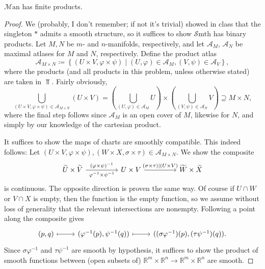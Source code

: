 \documentclass[11pt, letterpaper]{article}
\theoremstyle{theorem}
\begin{document}
\begin{proposition}\label{3.4}
	$\mathcal{M} \mathrm{an} $ has finite products.
\end{proposition}
\begin{proof}
	We (probably, I don't remember; if not it's trivial) showed in class that the singleton $*$ admits a smooth structure, so it suffices to show $\mathcal{S} \mathrm{mth} $ has binary products. Let $M,N$ be $m$- and $n$-manifolds, respectively, and let $\mathcal{A} _M$, $\mathcal{A} _N$ be maximal atlases for $M$ and $N$, respectively. Define the product atlas
	\[
		\mathcal{A}_{M\times N} \coloneqq \left\{ (U\times V,\varphi \times \psi )\mid (U,\varphi)\in \mathcal{A} _M,(V,\psi )\in \mathcal{A} _V \right\} ,
	\]
	where the products (and all products in this problem, unless otherwise stated) are taken in $\Top $. Fairly obviously,
	\[
		\bigcup_{(U\times V,\varphi \times \psi )\in \mathcal{A} _{M\times N} } (U\times V)=\left( \bigcup_{(U,\varphi )\in\mathcal{A} _M} U \right) \times \left( \bigcup_{(V,\psi )\in \mathcal{A} _N} V \right) \supseteq M\times N,
	\]
	where the final step follows since $\mathcal{A}_M$ is an open cover of $M$, likewise for $N$, and simply by our knowledge of the cartesian product.

	It suffices to show the maps of charts are smoothly compatible. This indeed follows: Let $(U\times V,\varphi \times \psi ),(W\times X,\sigma \times \tau )\in \mathcal{A} _{M\times N} $. We show the composite
	\[\begin{tikzcd}[row sep = 2.5em, column sep = 4.5em]
	\widetilde{U} \times \widetilde{V} \ar[" (\varphi \times \psi )^{-1}  ", " \varphi ^{-1} \times \psi ^{-1}  "', r]  & U\times V \ar[" (\sigma \times \tau )|(U\times V) ", r]  & \widetilde{W} \times \widetilde{X} 
	\end{tikzcd}\]
	is continuous. The opposite direction is proven the same way. Of course if $ U \cap W$ or $V \cap X$ is empty, then the function is the empty function, so we assume without loss of generality that the relevant intersections are nonempty. Following a point along the composite gives
	\[\begin{tikzcd}[row sep = 2.5em, column sep = 2.5em]
		(p,q)\ar[mapsto, r]  & (\varphi ^{-1} (p),\psi ^{-1} (q)) \ar[mapsto, r]  & ((\sigma \varphi ^{-1}) (p),(\tau \psi ^{-1} )(q)).
	\end{tikzcd}\]
	Since $\sigma \varphi ^{-1} $ and $\tau \psi ^{-1} $ are smooth by hypothesis, it suffices to show the product of smooth functions between (open subsets of) $\mathbb{R} ^m\times \mathbb{R} ^n \to \mathbb{R} ^m \times \mathbb{R} ^n$ are smooth.


\end{proof}
\end{document}
